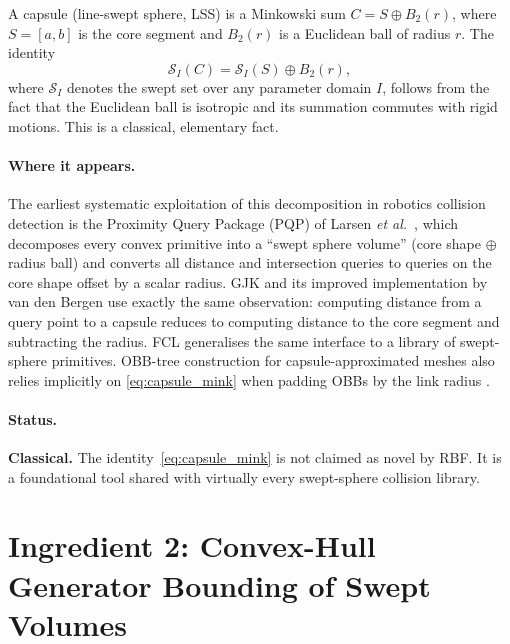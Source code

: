 \documentclass[11pt,a4paper]{article}
\newcommand{\etal}{\textit{et al.}}
\begin{document}
A capsule (line-swept sphere, LSS) is a Minkowski sum $C = S \oplus B_2(r)$,
where $S = [a,b]$ is the core segment and $B_2(r)$ is a Euclidean ball of
radius $r$.  The identity
\begin{equation}
  \mathcal{S}_I(C) = \mathcal{S}_I(S) \oplus B_2(r),
  \label{eq:capsule_mink}
\end{equation}
where $\mathcal{S}_I$ denotes the swept set over any parameter domain $I$,
follows from the fact that the Euclidean ball is isotropic and its summation
commutes with rigid motions.  This is a classical, elementary fact.

\paragraph{Where it appears.}
The earliest systematic exploitation of this decomposition in robotics
collision detection is the Proximity Query Package (PQP) of Larsen
\etal\ \cite{larsen1999fast}, which decomposes every convex primitive into a
``swept sphere volume'' (core shape $\oplus$ radius ball) and converts all
distance and intersection queries to queries on the core shape offset by a
scalar radius.  GJK \cite{gilbert1988fast} and its improved implementation by
van den Bergen \cite{bergen1999gjk} use exactly the same observation: computing
distance from a query point to a capsule reduces to computing distance to the
core segment and subtracting the radius.  FCL \cite{pan2012fcl} generalises
the same interface to a library of swept-sphere primitives.  OBB-tree
construction for capsule-approximated meshes also relies implicitly on
\cref{eq:capsule_mink} when padding OBBs by the link radius
\cite{gottschalk1996obbtree}.

\paragraph{Status.}
\textbf{Classical.}  The identity~\eqref{eq:capsule_mink} is not claimed as
novel by RBF.  It is a foundational tool shared with virtually every
swept-sphere collision library.

\section{Ingredient 2: Convex-Hull Generator Bounding of Swept Volumes}
\label{sec:hull_generator}
\end{document}
